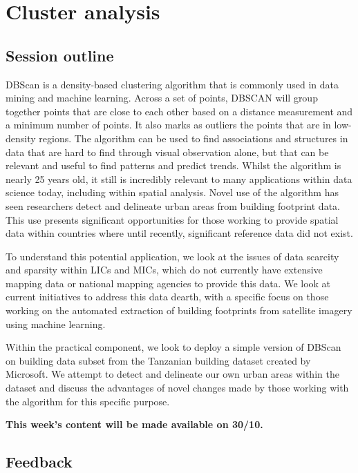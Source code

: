 \documentclass[
]{book}
\begin{document}
\hypertarget{cluster-analysis}{%
\chapter{Cluster analysis}\label{cluster-analysis}}

\hypertarget{session-outline}{%
\section{Session outline}\label{session-outline}}

DBScan is a density-based clustering algorithm that is commonly used in data mining and machine learning. Across a set of points, DBSCAN will group together points that are close to each other based on a distance measurement and a minimum number of points. It also marks as outliers the points that are in low-density regions. The algorithm can be used to find associations and structures in data that are hard to find through visual observation alone, but that can be relevant and useful to find patterns and predict trends. Whilst the algorithm is nearly 25 years old, it still is incredibly relevant to many applications within data science today, including within spatial analysis. Novel use of the algorithm has seen researchers detect and delineate urban areas from building footprint data. This use presents significant opportunities for those working to provide spatial data within countries where until recently, significant reference data did not exist.

To understand this potential application, we look at the issues of data scarcity and sparsity within LICs and MICs, which do not currently have extensive mapping data or national mapping agencies to provide this data. We look at current initiatives to address this data dearth, with a specific focus on those working on the automated extraction of building footprints from satellite imagery using machine learning.

Within the practical component, we look to deploy a simple version of DBScan on building data subset from the Tanzanian building dataset created by Microsoft. We attempt to detect and delineate our own urban areas within the dataset and discuss the advantages of novel changes made by those working with the algorithm for this specific purpose.

\textbf{This week's content will be made available on 30/10.}

\hypertarget{feedback}{%
\section{Feedback}\label{feedback}}
\end{document}
